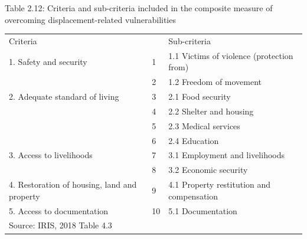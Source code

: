 \documentclass[
]{article}
\begin{document}
Table 2.12: Criteria and sub-criteria included in the composite measure
of overcoming displacement-related vulnerabilities

\begin{longtable}[]{@{}lll@{}}
\toprule
\endhead
Criteria & & Sub-criteria\tabularnewline
1. Safety and security & 1 & 1.1 Victims of violence (protection from)\tabularnewline
& 2 & 1.2 Freedom of movement\tabularnewline
2. Adequate standard of living & 3 & 2.1 Food security\tabularnewline
& 4 & 2.2 Shelter and housing\tabularnewline
& 5 & 2.3 Medical services\tabularnewline
& 6 & 2.4 Education\tabularnewline
3. Access to livelihoods & 7 & 3.1 Employment and livelihoods\tabularnewline
& 8 & 3.2 Economic security\tabularnewline
4. Restoration of housing, land and property & 9 & 4.1 Property restitution and compensation\tabularnewline
5. Access to documentation & 10 & 5.1 Documentation\tabularnewline
Source: IRIS, 2018 Table 4.3 & &\tabularnewline
\bottomrule
\end{longtable}
\end{document}
